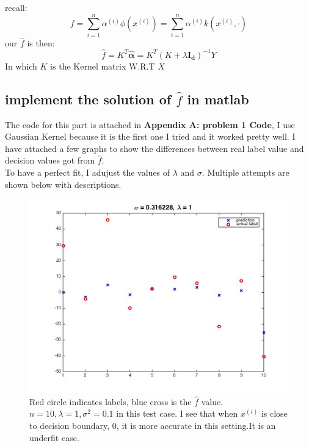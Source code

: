 \documentclass[twoside]{article}
\theoremstyle{definition}
\theoremstyle{definition}
\theoremstyle{remark}
\begin{document}
recall:
\[ f = \sum_{i=1}^n\alpha^{(i)}\phi(x^{(i)})= \sum_{i=1}^n\alpha^{(i)}k(x^{(i)},\cdot)\]
our $\hat f$ is then:
\[\hat f = K^T\boldsymbol{\hat \alpha}= K^T (K +  \lambda\mathbf{I_d})^{-1}Y\] In which $K$ is the Kernel matrix W.R.T $X$
\subsection{implement the solution of $\hat f$ in matlab}
The code for this part is attached in \textbf{Appendix A: problem 1 Code}, I use Gaussian Kernel because it is the first one I tried and it worked pretty well. I have attached a few graphs to show the differences between real label value and decision values got from $\hat f$.\\
To have a perfect fit, I adujust the values of $\lambda$ and $\sigma$. 
Multiple attempts are shown below with descriptions.
\begin{figure}[H]
\centering
\includegraphics[width=120mm]{problem1Pic1.jpg}
\caption{Red circle indicates labels, blue cross is the $\hat f$ value. $n=10, \lambda =1, \sigma^2 = 0.1$ in this test case. I see that when $x^{(i)}$ is close to decision boundary, 0, it is more accurate in this setting.It is an underfit case.  \label{problem1Pic1}}
\end{figure}
\end{document}
